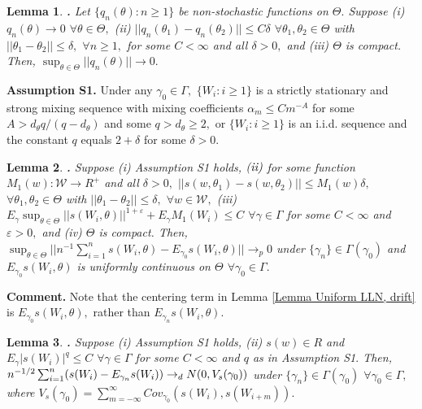 \documentclass[12pt,thmsb,titlepage,final,oneside,letterpaper]{article}
\newtheorem{lemma}{Lemma}[section]
\begin{document}
\begin{lemma}
\hspace{-0.08in}\textbf{.} \label{Lemma uniform convergence}Let $%
\{q_{n}(\theta ):n\geq 1\}$ be non-stochastic functions on $\Theta .$
Suppose \emph{(i)} $q_{n}(\theta )\rightarrow 0$ $\forall \theta \in \Theta
, $ \emph{(ii)} $||q_{n}(\theta _{1})-q_{n}(\theta _{2})||\leq C\delta $ $%
\forall \theta _{1},\theta _{2}\in \Theta $ with $||\theta _{1}-\theta
_{2}||\leq \delta ,$ $\forall n\geq 1,$ for some $C<\infty $ and all $\delta
>0,$ and \emph{(iii)} $\Theta $ is compact. Then, $\sup_{\theta \in \Theta
}||q_{n}(\theta )||\rightarrow 0.$
\end{lemma}

\noindent \textbf{Assumption S1. }Under any $\gamma _{0}\in \Gamma ,$ $%
\{W_{i}:i\geq 1\}$ is a strictly stationary and strong mixing sequence with
mixing coefficients $\alpha _{m}\leq Cm^{-A}$ for some $A>d_{\theta
}q/(q-d_{\theta })$ and some $q>d_{\theta }\geq 2,$ or $\{W_{i}:i\geq 1\}$
is an i.i.d. sequence and the constant $q$ equals $2+\delta $ for some $%
\delta >0.$

\begin{lemma}
\hspace{-0.08in}\textbf{.} \label{Lemma Uniform LLN, drift}Suppose \emph{(i)}
Assumption \emph{S1} holds, $\emph{(ii)}$ for some function $M_{1}(w):%
\mathcal{W}\rightarrow R^{+}$ and all $\delta >0,$ $||s(w,\theta
_{1})-s(w,\theta _{2})||\leq M_{1}(w)\delta ,$ $\forall \theta _{1},\theta
_{2}\in \Theta $ with $||\theta _{1}-\theta _{2}||\leq \delta ,$ $\forall
w\in \mathcal{W},$ \emph{(iii)} $E_{\gamma }\sup_{\theta \in \Theta
}||s(W_{i},\theta )||^{1+\varepsilon }+E_{\gamma }M_{1}(W_{i})\leq C$ $%
\forall \gamma \in \Gamma $ for some $C<\infty $ and $\varepsilon >0,$ and 
\emph{(iv)} $\Theta $ is compact. Then, $\sup_{\theta \in \Theta
}||n^{-1}\sum_{i=1}^{n}s(W_{i},\theta )-E_{\gamma _{0}}s(W_{i},\theta
)||\rightarrow _{p}0$ under $\{\gamma _{n}\}\in \Gamma (\gamma _{0})$ and $%
E_{\gamma _{0}}s(W_{i},\theta )$ is uniformly continuous on $\Theta $ $%
\forall \gamma _{0}\in \Gamma .$
\end{lemma}

\noindent \textbf{Comment.} Note that the centering term in Lemma \ref{Lemma
Uniform LLN, drift} is $E_{\gamma _{0}}s(W_{i},\theta ),$ rather than $%
E_{\gamma _{n}}s(W_{i},\theta ).$

\begin{lemma}
\hspace{-0.08in}\textbf{.} \label{Lemma CLT, array}Suppose \emph{(i)}
Assumption \emph{S1} holds, \emph{(ii)} $s(w)\in R$ and $E_{\gamma
}|s(W_{i})|^{q}\leq C$ $\forall \gamma \in \Gamma $ for some $C<\infty $ and 
$q$ as in Assumption \emph{S1}$.$ Then, $n^{-1/2}\sum_{i=1}^{n}(s(W_{i})-E_{%
\gamma _{n}}s(W_{i}))\rightarrow _{d}N(0,V_{s}(\gamma _{0}))$ under $\{
\gamma _{n}\} \in \Gamma (\gamma _{0})$ $\forall \gamma _{0}\in \Gamma ,$
where $V_{s}(\gamma _{0})=\sum_{m=-\infty }^{\infty }\allowbreak Cov_{\gamma
_{0}}(s(W_{i}),s(W_{i+m})).$
\end{lemma}
\end{document}
